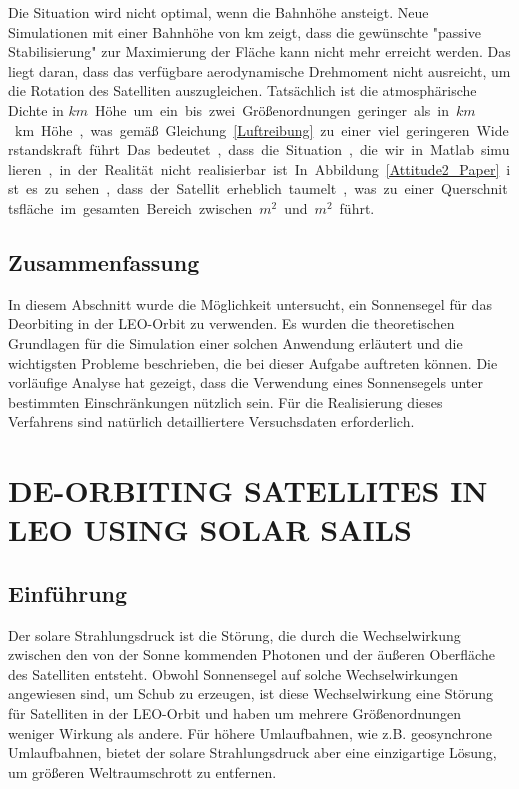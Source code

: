 Die Situation wird nicht optimal, wenn die Bahnhöhe ansteigt. Neue Simulationen mit einer Bahnhöhe von \unit[600]{km} zeigt, dass die gewünschte "passive Stabilisierung" zur Maximierung der Fläche kann nicht mehr erreicht werden. Das liegt daran, dass das verfügbare aerodynamische Drehmoment nicht ausreicht, um die Rotation des Satelliten auszugleichen. Tatsächlich ist die atmosphärische Dichte in \unit[600]{$km$} Höhe um ein bis zwei Größenordnungen geringer als in \unit[450]{$km$} km Höhe, was gemäß Gleichung \ref{Luftreibung} zu einer viel geringeren Widerstandskraft führt. Das bedeutet, dass die Situation, die wir in Matlab simulieren, in der Realität nicht realisierbar ist. In Abbildung \ref{Attitude2_Paper} ist es zu sehen, dass der Satellit erheblich taumelt, was zu einer Querschnittsfläche im gesamten Bereich zwischen \unit[0]{$m^2$} und \unit[25]{$m^2$} führt.

\subsection{Zusammenfassung}
In diesem Abschnitt wurde die Möglichkeit untersucht, ein Sonnensegel für das Deorbiting in der LEO-Orbit zu verwenden. Es wurden die theoretischen Grundlagen für die Simulation einer solchen Anwendung erläutert und die wichtigsten Probleme beschrieben, die bei dieser Aufgabe auftreten können. Die vorläufige Analyse hat gezeigt, dass die Verwendung eines Sonnensegels unter bestimmten Einschränkungen nützlich sein. Für die Realisierung dieses Verfahrens sind natürlich detailliertere Versuchsdaten erforderlich.


\section{DE-ORBITING SATELLITES IN LEO USING SOLAR SAILS}
\subsection{Einführung}
Der solare Strahlungsdruck ist die Störung, die durch die Wechselwirkung zwischen den von der Sonne kommenden Photonen und der äußeren Oberfläche des Satelliten entsteht. Obwohl Sonnensegel auf solche Wechselwirkungen angewiesen sind, um Schub zu erzeugen, ist diese Wechselwirkung eine Störung für Satelliten in der LEO-Orbit und haben um mehrere Größenordnungen weniger Wirkung als andere. Für höhere Umlaufbahnen, wie z.B. geosynchrone Umlaufbahnen, bietet der solare Strahlungsdruck aber eine einzigartige Lösung, um größeren Weltraumschrott zu entfernen. 

